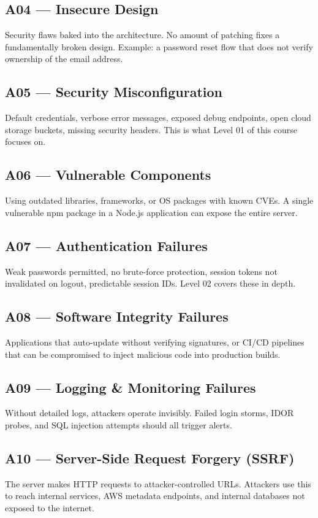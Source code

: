 \subsection{A04 --- Insecure Design}
Security flaws baked into the architecture. No amount of patching fixes a fundamentally broken design. Example: a password reset flow that does not verify ownership of the email address.

\subsection{A05 --- Security Misconfiguration}
Default credentials, verbose error messages, exposed debug endpoints, open cloud storage buckets, missing security headers. This is what Level 01 of this course focuses on.

\subsection{A06 --- Vulnerable Components}
Using outdated libraries, frameworks, or OS packages with known CVEs. A single vulnerable npm package in a Node.js application can expose the entire server.

\subsection{A07 --- Authentication Failures}
Weak passwords permitted, no brute-force protection, session tokens not invalidated on logout, predictable session IDs. Level 02 covers these in depth.

\subsection{A08 --- Software Integrity Failures}
Applications that auto-update without verifying signatures, or CI/CD pipelines that can be compromised to inject malicious code into production builds.

\subsection{A09 --- Logging \& Monitoring Failures}
Without detailed logs, attackers operate invisibly. Failed login storms, IDOR probes, and SQL injection attempts should all trigger alerts.

\subsection{A10 --- Server-Side Request Forgery (SSRF)}
The server makes HTTP requests to attacker-controlled URLs. Attackers use this to reach internal services, AWS metadata endpoints, and internal databases not exposed to the internet.

